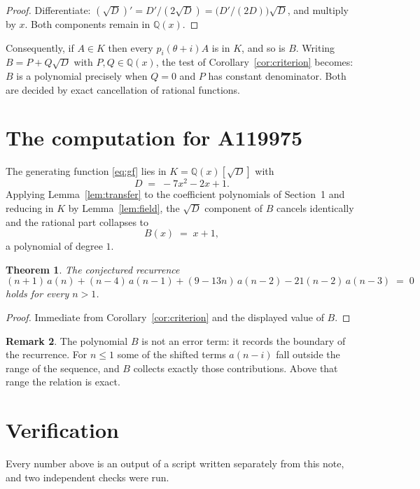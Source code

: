 \documentclass[11pt,a4paper]{article}
\theoremstyle{plain}
\newtheorem{theorem}{Theorem}
\theoremstyle{definition}
\newtheorem{remark}[theorem]{Remark}
\begin{document}
\begin{proof}
Differentiate: $(\sqrt{D})'=D'/(2\sqrt{D})=\bigl(D'/(2D)\bigr)\sqrt{D}$, and multiply by
$x$. Both components remain in $\mathbb{Q}(x)$.
\end{proof}

Consequently, if $A\in K$ then every $p_{i}(\theta+i)A$ is in $K$, and so is $B$. Writing
$B=P+Q\sqrt{D}$ with $P,Q\in\mathbb{Q}(x)$, the test of Corollary~\ref{cor:criterion}
becomes: $B$ is a polynomial precisely when $Q=0$ and $P$ has constant denominator. Both
are decided by exact cancellation of rational functions.

\section{The computation for A119975}

The generating function \eqref{eq:gf} lies in $K=\mathbb{Q}(x)[\sqrt{D}]$ with
\[
D \;=\; - 7 x^{2} - 2 x + 1 .
\]
Applying Lemma~\ref{lem:transfer} to the coefficient polynomials of Section~1 and reducing
in $K$ by Lemma~\ref{lem:field}, the $\sqrt{D}$ component of $B$ cancels identically and
the rational part collapses to
\[
B(x)\;=\;x + 1 ,
\]
a polynomial of degree $1$.

\begin{theorem}
The conjectured recurrence
\[
(n + 1)\,a(n) + (n - 4)\,a(n-1) + (9 - 13 n)\,a(n-2) -  21 \left(n - 2\right)\,a(n-3) \;=\;0
\]
holds for every $n>1$.
\end{theorem}

\begin{proof}
Immediate from Corollary~\ref{cor:criterion} and the displayed value of $B$.
\end{proof}

\begin{remark}
The polynomial $B$ is not an error term: it records the boundary of the recurrence. For
$n\le1$ some of the shifted terms $a(n-i)$ fall outside the range of the sequence,
and $B$ collects exactly those contributions. Above that range the relation is exact.
\end{remark}

\section{Verification}

Every number above is an output of a script written separately from this note, and two
independent checks were run.
\end{document}
